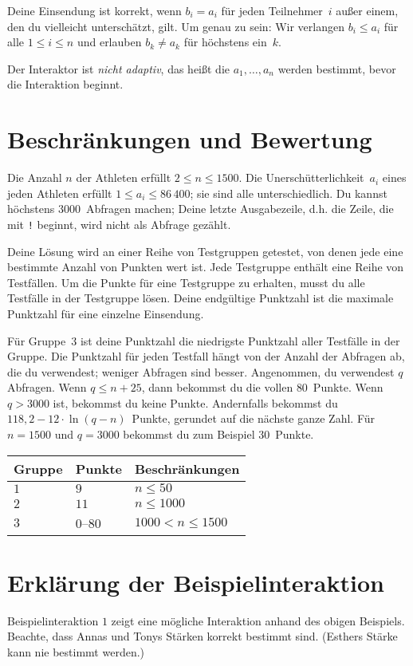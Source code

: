 Deine Einsendung ist korrekt, wenn $b_i=a_i$ für jeden Teilnehmer~$i$ außer einem, den du vielleicht unterschätzt, gilt.
Um genau zu sein: Wir verlangen $b_i\leq a_i$ für alle $1\leq i\leq n$ und erlauben $b_k \neq a_k$ für höchstens ein~$k$.

Der Interaktor ist \emph{nicht adaptiv}, das heißt die $a_1,\ldots, a_n$ werden bestimmt, bevor die Interaktion beginnt.

\section*{Beschränkungen und Bewertung}

Die Anzahl $n$ der Athleten erfüllt 
$2\leq n\leq 1500$. %
Die Unerschütterlichkeit~$a_i$ eines jeden Athleten erfüllt 
$1\leq a_i\leq 86\,400$; %
sie sind alle unterschiedlich. %
Du kannst 
höchstens $3000$~Abfragen machen; %
Deine letzte Ausgabezeile, d.h. die Zeile, die mit \texttt{!} beginnt, wird nicht als Abfrage gezählt.

Deine Lösung wird an einer Reihe von Testgruppen getestet, von denen jede eine bestimmte Anzahl von Punkten wert ist.
Jede Testgruppe enthält eine Reihe von Testfällen.
Um die Punkte für eine Testgruppe zu erhalten, musst du alle Testfälle in der Testgruppe lösen.
Deine endgültige Punktzahl ist die maximale Punktzahl für eine einzelne Einsendung.

Für Gruppe~$3$ ist deine Punktzahl die niedrigste Punktzahl aller Testfälle in der Gruppe.
Die Punktzahl für jeden Testfall hängt von der Anzahl der Abfragen ab, die du verwendest;
weniger Abfragen sind besser.
Angenommen, du verwendest $q$ Abfragen. 
Wenn $q \le n+25$, dann bekommst du die vollen $80$~Punkte. 
Wenn $q > 3000$ ist, bekommst du keine Punkte.
Andernfalls bekommst du 
$118{,}2 - 12 \cdot \ln(q - n)$~Punkte, gerundet auf die nächste ganze Zahl. %
Für $n = 1500$ und $q = 3000$ bekommst du zum Beispiel $30$~Punkte.

\medskip
\begin{tabular}{lll}
Gruppe & Punkte & Beschränkungen\\\hline
$1$  &  $9$ & $n\leq 50$\\
$2$  &  $11$ & $n\leq 1000$\\
$3$  &  $0$--$80$ & $1000 < n\leq 1500$\\
\end{tabular}

\section*{Erklärung der Beispielinteraktion}

Beispielinteraktion $1$ zeigt eine mögliche Interaktion anhand des obigen Beispiels. 
Beachte, dass Annas und Tonys Stärken korrekt bestimmt sind.
(Esthers Stärke kann nie bestimmt werden.)

